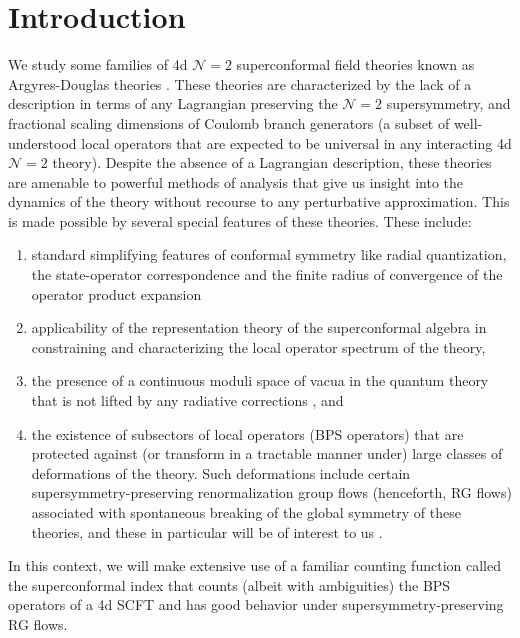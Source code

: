 \documentclass[a4paper,10pt]{article}
\newcommand{\tsf}[1]{\textsf{#1}}
\begin{document}
\section{Introduction}
We study some families of 4d $\mathcal{N}=2$ superconformal field theories known as Argyres-Douglas theories \cite{Argyres:1995jj, Argyres:1995xn, Witten:1997sc, Cecotti:2010fi, Xie:2012hs}. These theories are characterized by the lack of a description in terms of any Lagrangian preserving the $\mathcal{N}=2$ supersymmetry, and fractional scaling dimensions of Coulomb branch generators (a subset of well-understood local operators that are expected to be universal in any interacting 4d $\mathcal{N}=2$ theory). Despite the absence of a Lagrangian description, these theories are amenable to powerful methods of analysis that give us insight into the dynamics of the theory without recourse to any perturbative approximation. This is made possible by several special features of these theories. These include: 
\begin{enumerate}[(1)]
\item standard simplifying features of conformal symmetry like radial quantization, the state-operator correspondence and the finite radius of convergence of the operator product expansion \cite{Rattazzi:2008pe} 
\item applicability of the representation theory of the superconformal algebra \cite{Dolan:2002zh, Cordova:2016emh} in constraining and characterizing the local operator spectrum of the theory, \item the presence of a continuous moduli space of vacua in the quantum theory that is not lifted by any radiative corrections \cite{Argyres:1996eh}, and 
\item the existence of subsectors of local operators (BPS operators) that are protected against (or transform in a tractable manner under) large classes of deformations of the theory. Such deformations include certain supersymmetry-preserving renormalization group flows (henceforth, \tsf{RG} flows) associated with spontaneous breaking of the global symmetry of these theories, and these in particular will be of interest to us \cite{Maruyoshi:2016aim, Maruyoshi:2016tqk}. 
\end{enumerate}
In this context, we will make extensive use of a familiar counting function called the superconformal index \cite{Kinney:2005ej} that counts (albeit with ambiguities) the \tsf{BPS} operators of a 4d \tsf{SCFT} and has good behavior under supersymmetry-preserving \tsf{RG} flows.
\end{document}
